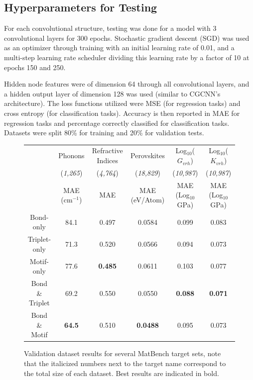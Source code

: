 \documentclass[10pt,a4paper]{article}
\begin{document}
\subsection{Hyperparameters for Testing}
For each convolutional structure, testing was done for a model with 3 convolutional layers for 300 epochs. Stochastic gradient descent (SGD) was used as an optimizer through training with an initial learning rate of 0.01, and a multi-step learning rate scheduler dividing this learning rate by a factor of 10 at epochs 150 and 250. 

Hidden node features were of dimension 64 through all convolutional layers, and a hidden output layer of dimension 128 was used (similar to CGCNN's architecture). The loss functions utilized were MSE (for regression tasks) and cross entropy (for classification tasks). Accuracy is then reported in MAE for regression tasks and percentage correctly classified for classification tasks. Datasets were split 80\% for training and 20\% for validation tests.

 
\begin{figure}\small
\begin{tabular}{c|ccccc}
 & Phonons  & Refractive Indices& Perovskites  & Log$_{10}$($G_{vrh}$) & Log$_{10}$($K_{vrh}$) \\
 & (\textit{1,265}) &  (\textit{4,764}) & (\textit{18,829}) & (\textit{10,987}) & (\textit{10,987}) \\
 & MAE (cm$^{-1}$) & MAE & MAE (eV/Atom)& MAE (Log$_{10}$GPa)& MAE (Log$_{10}$GPa)  \\
\hline
Bond-only & 84.1& 0.497 & 0.0584 & 0.099 & 0.083\\
Triplet-only & 71.3& 0.520 & 0.0566 & 0.094 & 0.073 \\
Motif-only & 77.6& \textbf{0.485} & 0.0611 & 0.103 & 0.077\\
Bond \& Triplet & 69.2& 0.550 & 0.0550 & \textbf{0.088}& \textbf{0.071} \\
Bond \& Motif & \textbf{64.5}& 0.510 & \textbf{0.0488}&0.095 & 0.073\\
\end{tabular}
\caption{Validation dataset results for several MatBench target sets, note that the italicized numbers next to the target name correspond to the total size of each dataset. Best results are indicated in bold.}
\end{figure}
\end{document}
